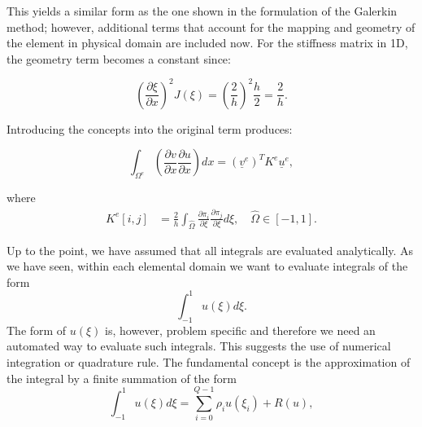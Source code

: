 \documentclass[
  a4paper,
  10pt]{article}
\begin{document}
This yields a similar form as the one shown in the formulation of the
Galerkin method; however, additional terms that account for the mapping
and geometry of the element in physical domain are included now. For the
stiffness matrix in 1D, the geometry term becomes a constant since:

\begin{equation}
(\frac{\partial \xi}{\partial x})^{2} J(\xi)= (\frac{2}{h})^{2}\frac{h}{2}=\frac{2}{h}.
\end{equation}

Introducing the concepts into the original term produces:

\begin{equation}
\int_{\Omega^{e}} ( \frac{\partial v}{\partial x}\frac{\partial u}{\partial x})dx =(\underline{v}^{e})^{T}K^{e}\underline{u}^{e},
\end{equation}

where \begin{align}
K^{e}[i,j]&=\frac{2}{h}\int_{\hat{\Omega}}\frac{\partial \pi_{i}}{\partial\xi}\frac{\partial \pi_{j}}{\partial\xi} d\xi, \quad \hat{\Omega} \in [-1,1]. 
\end{align}

Up to the point, we have assumed that all integrals are evaluated
analytically. As we have seen, within each elemental domain we want to
evaluate integrals of the form \begin{equation}
\int_{-1}^{1}u(\xi) d\xi.
\end{equation} The form of \(u(\xi)\) is, however, problem specific and
therefore we need an automated way to evaluate such integrals. This
suggests the use of numerical integration or quadrature rule. The fundamental
concept is the approximation of the integral by a finite summation of
the form \begin{equation}
\int_{-1}^{1}u(\xi)d\xi = \sum_{i=0}^{Q-1}\rho_iu(\xi_i)+R(u),
\end{equation}
\end{document}
